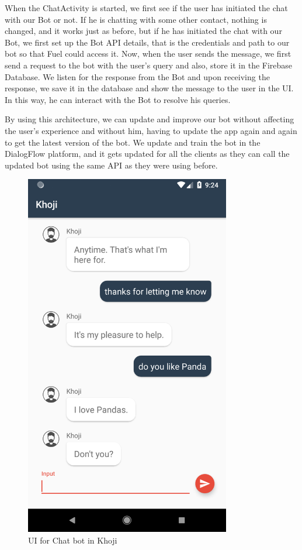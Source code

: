 When the ChatActivity is started, we first see if the user has initiated the chat with our Bot or not. If he is chatting with some other contact, nothing is changed, and it works just as before, but if he has initiated the chat with our Bot, we first set up the Bot API details, that is the credentials and path to our bot so that Fuel could access it. Now, when the user sends the message, we first send a request to the bot with the user's query and also, store it in the Firebase Database. We listen for the response from the Bot and upon receiving the response, we save it in the database and show the message to the user in the UI. In this way, he can interact with the Bot to resolve his queries.

By using this architecture, we can update and improve our bot without affecting the user's experience and without him, having to update the app again and again to get the latest version of the bot. We update and train the bot in the DialogFlow platform, and it gets updated for all the clients as they can call the updated bot using the same API as they were using before.

\begin{figure}[H]
	\centering
		\includegraphics[width=0.80\textwidth]{images/khoji_chatbot.png}
	\caption{UI for Chat bot in Khoji}
	\label{fig:khoji_chatbot}
\end{figure}








